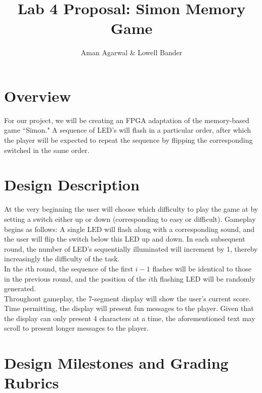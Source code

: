 \documentclass[]{article}
\newcommand{\subtitle}[1]{%
  \posttitle{%
    \par\end{center}
    \begin{center}\large#1\end{center}
    \vskip0.5em}%
}
\begin{document}
\title{Lab 4 Proposal: Simon Memory Game}
\subtitle{CS M152A}
\author{Aman Agarwal \& Lowell Bander}

\maketitle
\tableofcontents \newpage

\section{Overview}

For our project, we will be creating an FPGA adaptation of the memory-based game ``Simon." A sequence of LED's will flash in a particular order, after which the player will be expected to repeat the sequence by flipping the corresponding switched in the same order.

\section{Design Description}

At the very beginning the user will choose which difficulty to play the game at by setting a switch either up or down (corresponding to easy or difficult). Gameplay begins as follows: A single LED will flash along with a corresponding sound, and the user will flip the switch below this LED up and down. In each subsequent round, the number of LED's sequentially illuminated will increment by 1, thereby increasingly the difficulty of the task.\\

In the $i$th round, the sequence of the first $i-1$ flashes will be identical to those in the previous round, and the position of the $i$th flashing LED will be randomly generated.\\

Throughout gameplay, the 7-segment display will show the user's current score. Time permitting, the display will present fun messages to the player. Given that the display can only present 4 characters at a time, the aforementioned text may scroll to present longer messages to the player.

\section{Design Milestones and Grading Rubrics}
\end{document}

